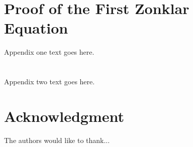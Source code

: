 \documentclass[journal]{IEEEtran}
\begin{document}
{	%
	\appendices
	\section{Proof of the First Zonklar Equation}
	Appendix one text goes here.
	
	\section{}
	Appendix two text goes here.
	
	\section*{Acknowledgment}
	The authors would like to thank...
	
	
	
	\begin{thebibliography}{1}
		

\end{thebibliography}}
\end{document}
